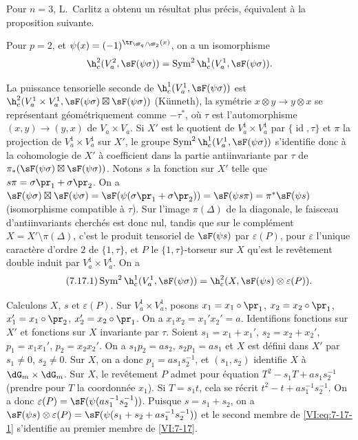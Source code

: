 Pour $n=3$, L.\ Carlitz \cite{ca69-2} a obtenu un résultat plus précis, 
équivalent à la proposition suivante. 





\begin{proposition_}\label{VI:7-17}
Pour $p=2$, et $\psi(x)=(-1)^{\tr_{\dF_q/\dF_2}(x)}$, on a un isomorphisme 
\[
  \h_c^2(V_a^2,\sF(\psi\sigma)) = \operatorname{Sym}^2 \h_c^1(V_a^1,\sF(\psi\sigma)) \text{.} 
\]
\end{proposition_}

La puissance tensorielle seconde de $\h_c^1(V_a^1,\sF(\psi\sigma))$ est 
$\h_c^2(V_a^1\times V_a^1,\sF(\psi\sigma)\boxtimes \sF(\psi\sigma))$ 
(K\"unneth), la symétrie $x\otimes y\to y\otimes x$ se représentant 
géométriquement comme $-\tau^\ast$, où $\tau$ est l'automorphisme 
$(x,y)\to (y,x)$ de $V_a\times V_a$. Si $X'$ est le quotient de 
$V_a^1\times V_a^1$ par $\{\operatorname{id}{},\tau\}$ et $\pi$ la 
projection de $V_a^1\times V_a^1$ sur $X'$, le groupe 
$\operatorname{Sym}^2 \h_c^1(V_a^1,\sF(\psi\sigma))$ s'identifie donc à la 
cohomologie de $X'$ à coefficient dans la partie antiinvariante par $\tau$ de 
$\pi_\ast(\sF(\psi\sigma)\boxtimes \sF(\psi\sigma))$. Notons $s$ la fonction 
sur $X'$ telle que $s\pi =\sigma\pr_1+\sigma\pr_2$. On a 
$\sF(\psi\sigma)\boxtimes \sF(\psi\sigma) = \sF(\psi(\sigma\pr_1+\sigma\pr_2)) = \sF(\psi s \pi) = \pi^\ast \sF(\psi s)$ 
(isomorphisme compatible à $\tau$). Sur l'image $\pi(\Delta)$ de la 
diagonale, le faisceau d'antiinvariants cherchés est donc nul, tandis que sur 
le complément $X=X'\setminus \pi(\Delta)$, c'est le produit tensoriel de 
$\sF(\psi s)$ par $\varepsilon(P)$, pour $\varepsilon$ l'unique caractère 
d'ordre $2$ de $\{1,\tau\}$, et $P$ le $\{1,\tau\}$-torseur sur $X$ qu'est le 
revêtement double induit par $V_a^1\times V_a^1$. On a 
\begin{equation*}\tag{7.17.1}\label{VI:eq:7-17-1}
  \operatorname{Sym}^2 \h_c^1(V_a^1,\sF(\psi\sigma)) = \h_c^2(X,\sF(\psi s)\otimes \varepsilon(P)) \text{.}
\end{equation*}

Calculons $X$, $s$ et $\varepsilon(P)$. Sur $V_a^1\times V_a^1$, posons 
$x_1=x_1\circ\pr_1$, $x_2=x_2\circ\pr_1$, $x_1'=x_1\circ \pr_2$, 
$x_2'=x_2\circ \pr_1$. On a $x_1 x_2=x_1'x_2'=a$. Identifions fonctions sur 
$X'$ et fonctions sur $X$ invariante par $\tau$. Soient $s_1=x_1+x_1'$, 
$s_2=x_2+x_2'$, $p_1=x_1 x_1'$, $p_2=x_2 x_2'$. On a $s_1 p_2 = a s_2$, 
$s_2 p_1 = a s_1$ et $X$ est défini dans $X'$ par $s_1\ne 0$, $s_2\ne 0$. Sur 
$X$, on a donc $p_1 = a s_1 s_2^{-1}$, et $(s_1,s_2)$ identifie $X$ à 
$\dG_m\times \dG_m$. Sur $X$, le revêtement $P$ admet pour équation 
$T^2-s_1 T+a s_1 s_2^{-1}$ (prendre pour $T$ la coordonnée $x_1$). Si 
$T=s_1 t$, cela se récrit $t^2-t+a s_1^{-1} s_2^{-1}$. On a donc 
$\varepsilon(P) = \sF(\psi(a s_1^{-1} s_2^{-1}))$. Puisque $s=s_1+s_2$, on a 
$\sF(\psi s)\otimes \varepsilon(P) = \sF(\psi(s_1+s_2+ a s_1^{-1} s_2^{-1}))$ 
et le second membre de \eqref{VI:eq:7-17-1} s'identifie au premier membre de 
\ref{VI:7-17}. 


